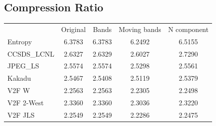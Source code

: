 \documentclass{article}
\begin{document}
\subsection*{Compression Ratio}
\begin{table}[h]
\begin{tabular}{lcccc}
\rowcolor[HTML]{C0C0C0} 
 & Original & Bands & Moving bands & N component \\
\cellcolor[HTML]{C0C0C0}Entropy & \cellcolor[HTML]{E0E0E0} 6.3783&  \cellcolor[HTML]{E0E0E0} 6.3783&  \cellcolor[HTML]{E0E0E0} 6.2492&  \cellcolor[HTML]{E0E0E0} 6.5155\\ 
\cellcolor[HTML]{C0C0C0}CCSDS\_LCNL & 2.6327 & 2.6329 & 2.6027 & \cellcolor[HTML]{DAE8FC}2.7290  \\
\cellcolor[HTML]{C0C0C0}JPEG\_LS    & \cellcolor[HTML]{DAE8FC}2.5574 & \cellcolor[HTML]{DAE8FC}2.5574 & 2.5298 & 2.5561  \\
\cellcolor[HTML]{C0C0C0}Kakadu      & \cellcolor[HTML]{DAE8FC}2.5467 & 2.5408 & 2.5119 & 2.5379  \\
\cellcolor[HTML]{C0C0C0}V2F W       & \cellcolor[HTML]{DAE8FC}2.2563 & \cellcolor[HTML]{DAE8FC}2.2563 & 2.2305 & 2.2498  \\
\cellcolor[HTML]{C0C0C0}V2F 2-West  & \cellcolor[HTML]{DAE8FC}2.3360 & \cellcolor[HTML]{DAE8FC}2.3360 & 2.3036 & 2.3220  \\
\cellcolor[HTML]{C0C0C0}V2F JLS     & \cellcolor[HTML]{DAE8FC}2.2549 & \cellcolor[HTML]{DAE8FC}2.2549 & 2.2286 & 2.2475  \\
\end{tabular}
\end{table}
\end{document}
